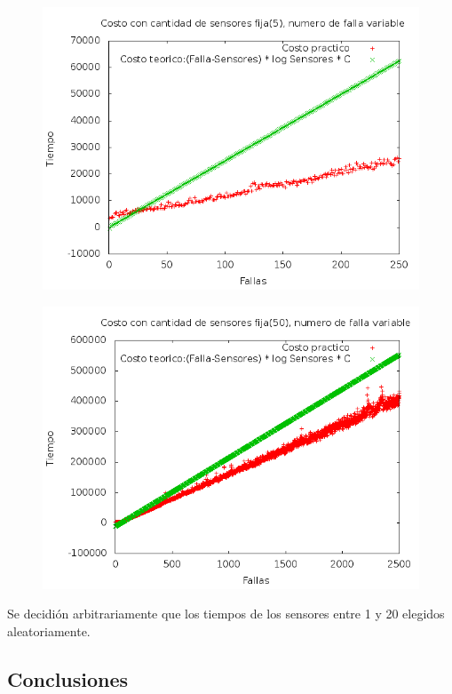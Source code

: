 \begin{figure}[H]
	\centering
	\includegraphics[scale=0.6]{ej2-grafico2.png}
	\caption{ }
\end{figure}

\begin{figure}[H]
	\centering
	\includegraphics[scale=0.6]{ej2-grafico3.png}
	\caption{ }
\end{figure}

\quad Se decidi\'on arbitrariamente que los tiempos de los sensores entre 1 y 20 elegidos aleatoriamente.

\subsection{Conclusiones}

